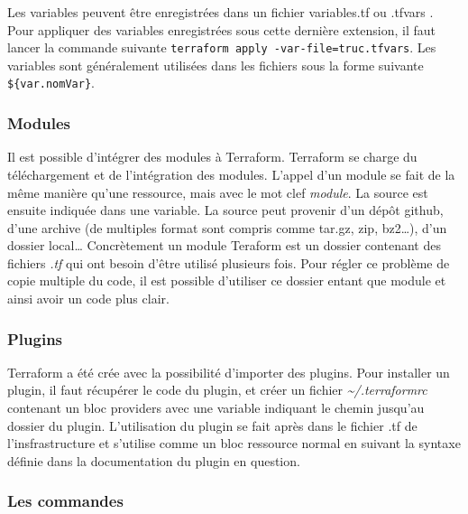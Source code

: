 \documentclass[]{article}
\begin{document}
Les variables peuvent être enregistrées dans un fichier
\og variables.tf \fg ou \og
.tfvars \fg. Pour appliquer des variables enregistrées
sous cette dernière extension, il faut lancer la commande suivante
\texttt{terraform\ apply\ -var-file=truc.tfvars}. Les variables sont
généralement utilisées dans les fichiers sous la forme suivante
\texttt{\$\{var.nomVar\}}.

\subsubsection{Modules}\label{modules}

Il est possible d'intégrer des modules à Terraform. Terraform se charge
du téléchargement et de l'intégration des modules. L'appel d'un module
se fait de la même manière qu'une ressource, mais avec le mot clef
\emph{module}. La source est ensuite indiquée dans une variable. La
source peut provenir d'un dépôt github, d'une archive (de multiples
format sont compris comme tar.gz, zip, bz2\ldots{}), d'un dossier
local\ldots{} Concrètement un module Teraform est un dossier contenant
des fichiers \emph{.tf} qui ont besoin d'être utilisé plusieurs fois.
Pour régler ce problème de copie multiple du code, il est possible
d'utiliser ce dossier entant que module et ainsi avoir un code plus
clair.

\subsubsection{Plugins}\label{plugins}

Terraform a été crée avec la possibilité d'importer des plugins. Pour
installer un plugin, il faut récupérer le code du plugin, et créer un
fichier \emph{\textasciitilde{}/.terraformrc} contenant un bloc
providers avec une variable indiquant le chemin jusqu'au dossier du
plugin. L'utilisation du plugin se fait après dans le fichier .tf de
l'insfrastructure et s'utilise comme un bloc ressource normal en suivant
la syntaxe définie dans la documentation du plugin en question.

\subsubsection{Les commandes}\label{les-commandes}
\end{document}
